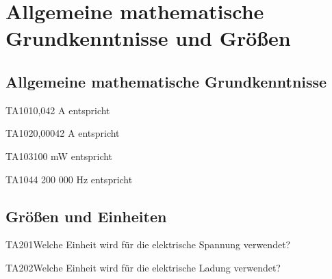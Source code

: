\section{Allgemeine mathematische Grundkenntnisse und Größen}

\subsection{Allgemeine mathematische Grundkenntnisse}

\begin{question}{TA101}{0,042 A entspricht}
\end{question}

\begin{question}{TA102}{0,00042 A entspricht}
\end{question}

\begin{question}{TA103}{100 mW entspricht}
\end{question}

\begin{question}{TA104}{4 200 000 Hz entspricht}
\end{question}

\subsection{Größen und Einheiten}

\begin{question}{TA201}{Welche Einheit wird für die elektrische Spannung verwendet?}
\end{question}

\begin{question}{TA202}{Welche Einheit wird für die elektrische Ladung verwendet?}
\end{question}

